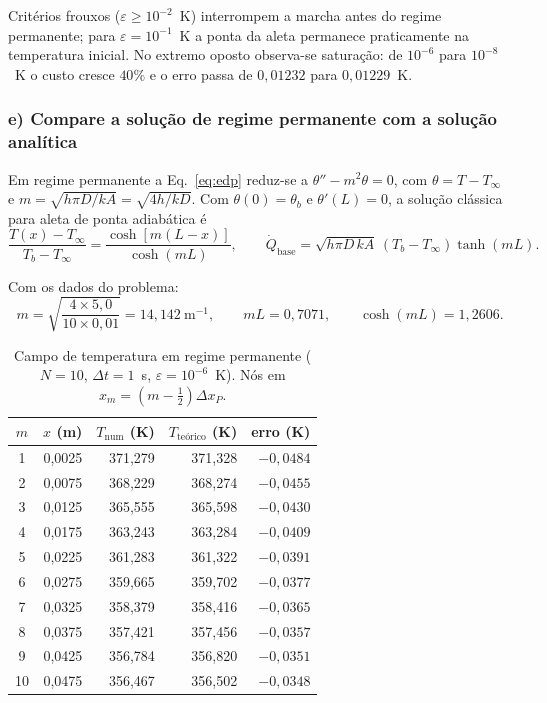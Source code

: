 Critérios frouxos ($\varepsilon\ge10^{-2}$~K) interrompem a marcha antes do
regime permanente; para $\varepsilon=10^{-1}$~K a ponta da aleta permanece
praticamente na temperatura inicial. No extremo oposto observa-se saturação:
de $10^{-6}$ para $10^{-8}$~K o custo cresce $40\%$ e o erro passa de
$0{,}01232$ para $0{,}01229$~K. 
\vspace{0.5cm}

\subsubsection*{e) Compare a solução de regime permanente com a solução analítica}

Em regime permanente a Eq.~\eqref{eq:edp} reduz-se a $\theta''-m^2\theta=0$,
com $\theta=T-T_\infty$ e $m=\sqrt{h\pi D/kA}=\sqrt{4h/kD}$. Com
$\theta(0)=\theta_b$ e $\theta'(L)=0$, a solução clássica para aleta de ponta
adiabática é
\begin{equation}
  \frac{T(x)-T_\infty}{T_b-T_\infty}
  =\frac{\cosh\!\left[m(L-x)\right]}{\cosh(mL)},
  \qquad
  \dot Q_{\text{base}}=\sqrt{h\pi D\,kA}\,\left(T_b-T_\infty\right)\tanh(mL).
\end{equation}

Com os dados do problema:
\[
  m=\sqrt{\frac{4\times5{,}0}{10\times0{,}01}}=14{,}142\ \mathrm{m^{-1}},
  \qquad mL=0{,}7071,\qquad \cosh(mL)=1{,}2606 .
\]

\begin{table}[H]
\centering
\caption{Campo de temperatura em regime permanente ($N=10$,
$\Delta t=1$~s, $\varepsilon=10^{-6}$~K). Nós em
$x_m=(m-\tfrac{1}{2})\Delta x_P$.}
\begin{tabular}{crrrr}
\hline
$m$ & $x$ (m) & $T_{\text{num}}$ (K) & $T_{\text{teórico}}$ (K) & erro (K)\\
\hline
1  & 0,0025 & 371,279 & 371,328 & $-0{,}0484$\\
2  & 0,0075 & 368,229 & 368,274 & $-0{,}0455$\\
3  & 0,0125 & 365,555 & 365,598 & $-0{,}0430$\\
4  & 0,0175 & 363,243 & 363,284 & $-0{,}0409$\\
5  & 0,0225 & 361,283 & 361,322 & $-0{,}0391$\\
6  & 0,0275 & 359,665 & 359,702 & $-0{,}0377$\\
7  & 0,0325 & 358,379 & 358,416 & $-0{,}0365$\\
8  & 0,0375 & 357,421 & 357,456 & $-0{,}0357$\\
9  & 0,0425 & 356,784 & 356,820 & $-0{,}0351$\\
10 & 0,0475 & 356,467 & 356,502 & $-0{,}0348$\\
\hline
\end{tabular}
\end{table}

